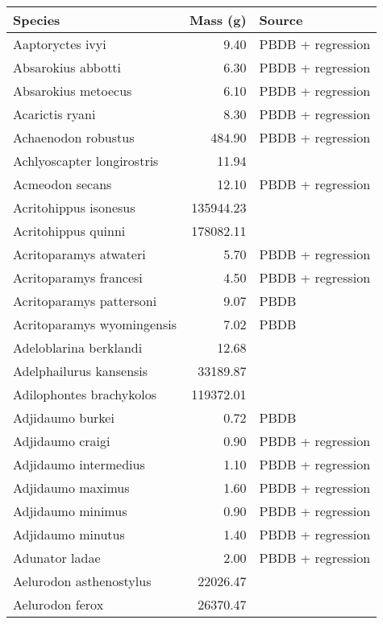 \begin{table}[ht]
\centering
\begin{tabular}{lrl}
  \hline
Species & Mass (g) & Source \\ 
  \hline
Aaptoryctes ivyi & 9.40 & PBDB + regression \\ 
  Absarokius abbotti & 6.30 & PBDB + regression \\ 
  Absarokius metoecus & 6.10 & PBDB + regression \\ 
  Acarictis ryani & 8.30 & PBDB + regression \\ 
  Achaenodon robustus & 484.90 & PBDB + regression \\ 
  Achlyoscapter longirostris & 11.94 & \cite{Tomiya2013} \\ 
  Acmeodon secans & 12.10 & PBDB + regression \\ 
  Acritohippus isonesus & 135944.23 & \cite{Tomiya2013} \\ 
  Acritohippus quinni & 178082.11 & \cite{Tomiya2013} \\ 
  Acritoparamys atwateri & 5.70 & PBDB + regression \\ 
  Acritoparamys francesi & 4.50 & PBDB + regression \\ 
  Acritoparamys pattersoni & 9.07 & PBDB \\ 
  Acritoparamys wyomingensis & 7.02 & PBDB \\ 
  Adeloblarina berklandi & 12.68 & \cite{Tomiya2013} \\ 
  Adelphailurus kansensis & 33189.87 & \cite{Tomiya2013} \\ 
  Adilophontes brachykolos & 119372.01 & \cite{Tomiya2013} \\ 
  Adjidaumo burkei & 0.72 & PBDB \\ 
  Adjidaumo craigi & 0.90 & PBDB + regression \\ 
  Adjidaumo intermedius & 1.10 & PBDB + regression \\ 
  Adjidaumo maximus & 1.60 & PBDB + regression \\ 
  Adjidaumo minimus & 0.90 & PBDB + regression \\ 
  Adjidaumo minutus & 1.40 & PBDB + regression \\ 
  Adunator ladae & 2.00 & PBDB + regression \\ 
  Aelurodon asthenostylus & 22026.47 & \cite{Tomiya2013} \\ 
  Aelurodon ferox & 26370.47 & \cite{Tomiya2013} \\ 

\end{tabular}
\end{table}
